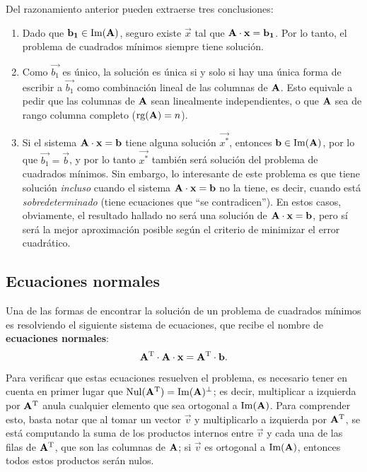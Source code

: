 Del razonamiento anterior pueden extraerse tres conclusiones:
\begin{enumerate}[label=(\roman*)]
\item Dado que $\mathbf{b_1} \in \operatorname{Im}(\mathbf{A})$, seguro existe $\vec{x}$ tal que
    $\mathbf{A} \cdot \mathbf{x} = \mathbf{b_1}$. Por lo tanto, el problema de
    cuadrados mínimos siempre tiene solución.
\item Como $\vec{b_1}$ es único, la solución es única si y solo si hay
    una única forma de escribir a $\vec{b_1}$ como combinación lineal de las
    columnas de $\mathbf{A}$. Esto equivale a pedir que las columnas de $\mathbf{A}$
    sean linealmente independientes, o que $\mathbf{A}$ sea de rango columna
    completo ($\operatorname{rg}(\mathbf{A}) = n$).
\item Si el sistema $\mathbf{A} \cdot \mathbf{x} = \mathbf{b}$ tiene alguna solución
    $\vec{x^\ast}$, entonces $\mathbf{b} \in \operatorname{Im}(\mathbf{A})$, por lo que
    $\vec{b_1} = \vec{b}$, y por lo tanto
    $\vec{x^\ast}$ también será solución del problema de cuadrados mínimos.
    Sin embargo, lo interesante de este problema es que tiene solución
    \emph{incluso} cuando el sistema $\mathbf{A} \cdot \mathbf{x} = \mathbf{b}$ no
    la tiene, es decir, cuando está \emph{sobredeterminado} (tiene ecuaciones
    que ``se contradicen''). En estos casos, obviamente, el resultado
    hallado no será una solución de $\mathbf{A} \cdot \mathbf{x} = \mathbf{b}$,
    pero sí será la mejor aproximación posible según el criterio de
    minimizar el error cuadrático.
\end{enumerate}

\subsection{Ecuaciones normales}
Una de las formas de encontrar la solución de un problema de cuadrados
mínimos es resolviendo el siguiente sistema de ecuaciones, que recibe el
nombre de \textbf{ecuaciones normales}:
\[ \mathbf{A}^{\mathrm{T}} \cdot \mathbf{A} \cdot \mathbf{x} = \mathbf{A}^{\mathrm{T}} \cdot \mathbf{b}. \]

Para verificar que estas ecuaciones resuelven el problema, es necesario tener
en cuenta en primer lugar que
$\operatorname{Nul}(\mathbf{A}^{\mathrm{T}}) = \operatorname{Im}(\mathbf{A})^{\bot}$; es decir, multiplicar a izquierda
por $\mathbf{A}^{\mathrm{T}}$ anula cualquier elemento que sea ortogonal a
$\operatorname{Im}(\mathbf{A})$. Para comprender esto, basta notar que al tomar un
vector $\vec{v}$ y multiplicarlo a izquierda por $\mathbf{A}^{\mathrm{T}}$, se está
computando la suma de los productos internos entre $\vec{v}$ y cada una de
las filas de $\mathbf{A}^{\mathrm{T}}$, que son las columnas de $\mathbf{A}$; si $\vec{v}$
es ortogonal a $\operatorname{Im}(\mathbf{A})$, entonces todos estos productos serán nulos.

